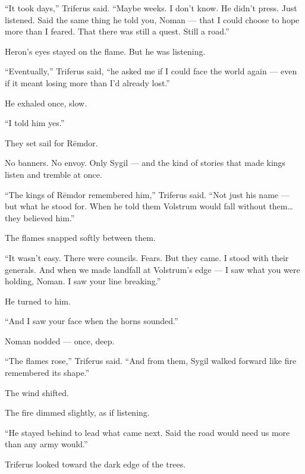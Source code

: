 \documentclass[12pt]{article}
\begin{document}
“It took days,” Triferus said. “Maybe weeks. I don’t know. He didn’t press. Just listened. Said the same thing he told you, Noman — that I could choose to hope more than I feared. That there was still a quest. Still a road.”

\vspace{1em}

Heron’s eyes stayed on the flame. But he was listening.

“Eventually,” Triferus said, “he asked me if I could face the world again — even if it meant losing more than I’d already lost.”

He exhaled once, slow.

“I told him yes.”

\vspace{1em}

They set sail for Rēmdor.

No banners. No envoy. Only Sygil — and the kind of stories that made kings listen and tremble at once.

“The kings of Rēmdor remembered him,” Triferus said. “Not just his name — but what he stood for. When he told them Volstrum would fall without them… they believed him.”

The flames snapped softly between them.

“It wasn’t easy. There were councils. Fears. But they came. I stood with their generals. And when we made landfall at Volstrum’s edge — I saw what you were holding, Noman. I saw your line breaking.”

\vspace{1em}

He turned to him.

“And I saw your face when the horns sounded.”

Noman nodded — once, deep.

\vspace{1em}

“The flames rose,” Triferus said. “And from them, Sygil walked forward like fire remembered its shape.”

\vspace{1em}

The wind shifted.

The fire dimmed slightly, as if listening.

“He stayed behind to lead what came next. Said the road would need us more than any army would.”

Triferus looked toward the dark edge of the trees.
\end{document}
